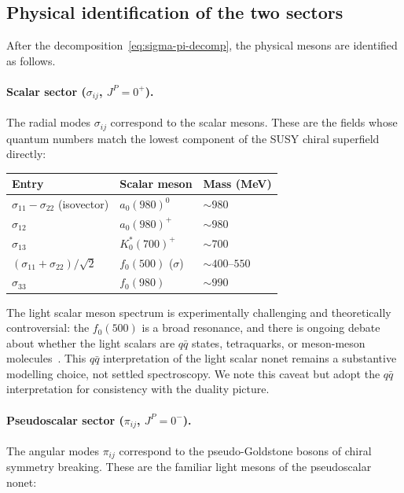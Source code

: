 \documentclass[11pt,a4paper]{article}
\begin{document}
\subsection{Physical identification of the two sectors}
\label{sec:physical-id}

After the decomposition~\eqref{eq:sigma-pi-decomp}, the physical
mesons are identified as follows.

\paragraph{Scalar sector ($\sigma_{ij}$, $J^P = 0^+$).}
The radial modes $\sigma_{ij}$ correspond to the scalar mesons.
These are the fields whose quantum numbers match the lowest component
of the SUSY chiral superfield directly:

\begin{center}
\renewcommand{\arraystretch}{1.2}
\begin{tabular}{lll}
\toprule
\textbf{Entry} & \textbf{Scalar meson} & \textbf{Mass (MeV)} \\
\midrule
$\sigma_{11} - \sigma_{22}$ (isovector) & $a_0(980)^0$ & $\sim 980$ \\
$\sigma_{12}$ & $a_0(980)^+$ & $\sim 980$ \\
$\sigma_{13}$ & $K_0^{*}(700)^+$ & $\sim 700$ \\
$(\sigma_{11} + \sigma_{22})/\sqrt{2}$
  & $f_0(500)$ ($\sigma$) & $\sim 400$--$550$ \\
$\sigma_{33}$ & $f_0(980)$ & $\sim 990$ \\
\bottomrule
\end{tabular}
\end{center}
The light scalar meson spectrum is experimentally challenging and
theoretically controversial: the $f_0(500)$ is a broad resonance,
and there is ongoing debate about whether the light scalars are
$q\bar{q}$ states, tetraquarks, or meson-meson
molecules~\cite{PDG2024}.  This $q\bar{q}$ interpretation of the light scalar nonet remains a substantive modelling choice, not settled spectroscopy.  We note this caveat but adopt the
$q\bar{q}$ interpretation for consistency with the duality
picture.

\paragraph{Pseudoscalar sector ($\pi_{ij}$, $J^P = 0^-$).}
The angular modes $\pi_{ij}$ correspond to the pseudo-Goldstone bosons
of chiral symmetry breaking.  These are the familiar light mesons
of the pseudoscalar nonet:
\end{document}
